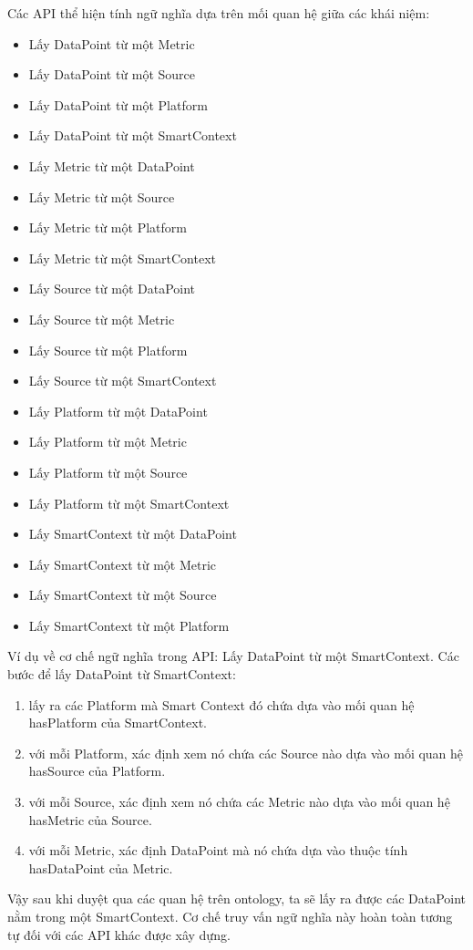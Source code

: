 Các API thể hiện tính ngữ nghĩa dựa trên mối quan hệ giữa các khái niệm:
\begin{itemize}
	\item Lấy DataPoint từ một Metric
	\item Lấy DataPoint từ một Source
	\item Lấy DataPoint từ một Platform
	\item Lấy DataPoint từ một SmartContext
	\item Lấy Metric từ một DataPoint
	\item Lấy Metric từ một Source
	\item Lấy Metric từ một Platform
	\item Lấy Metric từ một SmartContext
	\item Lấy Source từ một DataPoint
	\item Lấy Source từ một Metric
	\item Lấy Source từ một Platform
	\item Lấy Source từ một SmartContext
	\item Lấy Platform từ một DataPoint
	\item Lấy Platform từ một Metric
	\item Lấy Platform từ một Source
	\item Lấy Platform từ một SmartContext
	\item Lấy SmartContext từ một DataPoint
	\item Lấy SmartContext từ một Metric
	\item Lấy SmartContext từ một Source
	\item Lấy SmartContext từ một Platform
\end{itemize}


Ví dụ về cơ chế ngữ nghĩa trong API: Lấy DataPoint từ một SmartContext.
Các bước để lấy DataPoint từ SmartContext:
\begin{enumerate}
	\item lấy ra các Platform mà Smart Context đó chứa dựa vào mối quan hệ hasPlatform của SmartContext.
	\item với mỗi Platform, xác định xem nó chứa các Source nào dựa vào mối quan hệ hasSource của Platform.
	\item với mỗi Source, xác định xem nó chứa các Metric nào dựa vào mối quan hệ hasMetric của Source.
	\item với mỗi Metric, xác định DataPoint mà nó chứa dựa vào thuộc tính hasDataPoint của Metric.
\end{enumerate}

Vậy sau khi duyệt qua các quan hệ trên ontology, ta sẽ lấy ra được các DataPoint nằm trong một SmartContext. Cơ chế truy vấn ngữ nghĩa này hoàn toàn tương tự đối với các API khác được xây dựng.